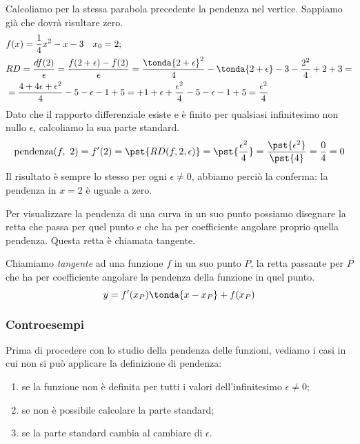 \begin{esempio}
Calcoliamo per la stessa parabola precedente la pendenza nel vertice. 
Sappiamo già che dovrà risultare zero.\\
\begin{align*}
 &f(x) = \dfrac{1}{4} x^2 -x -3 \quad x_0=2;\\
 &RD=\frac{df(2)}{\epsilon}=\frac{f(2+\epsilon) - f(2)}{\epsilon}=
  \frac{\tonda{2 +\epsilon}^2}{4}  -\tonda{2 +\epsilon} -3 - 
           \frac{2^2}{4}  +2 +3 =\\
  &= \dfrac{4 +4 \epsilon +\epsilon^2}{4} -5 -\epsilon - 1 +5 =
 +1+ \epsilon +\frac{\epsilon^2}{4} -5 -\epsilon - 1 +5 =
 \frac{\epsilon^2}{4}
  \end{align*}
Dato che il rapporto differenziale esiste e è finito per qualsiasi 
infinitesimo non nullo \(\epsilon\), calcoliamo la sua parte standard.
\[\text{pendenza}(f,~2) = f'(2) = 
  \pst{RD(f, 2, \epsilon)} = \pst{\frac{\epsilon^2}{4}} = 
  \frac{\pst{\epsilon^2}}{\pst{4}} = \frac{0}{4} = 0\]
Il risultato è sempre lo stesso per ogni \(\epsilon \ne 0\), abbiamo 
perciò la conferma: la pendenza in \(x=2\) è uguale a zero.
\end{esempio}

Per visualizzare la pendenza di una curva in un suo punto 
possiamo disegnare la retta che passa per quel punto e che ha per 
coefficiente angolare proprio quella pendenza. 
Questa retta è chiamata tangente.

\begin{definizione}
Chiamiamo \emph{tangente} ad una funzione \(f\) in un suo punto \(P\), 
la retta passante per \(P\) che ha per coefficiente angolare la 
pendenza della funzione in quel punto.
\[y = f'(x_P) \tonda{x -x_P} +f(x_P)\]
\end{definizione}

\subsubsection{Controesempi}
\label{subsubsec:controesempi}

Prima di procedere con lo studio della pendenza delle funzioni, vediamo 
i casi in cui non si può applicare la definizione di pendenza:
\begin{enumerate} [nosep]
\item se la funzione non è definita per tutti i valori dell'infinitesimo 
\(\epsilon \ne 0\);
\item se non è possibile calcolare la parte standard;
\item se la parte standard cambia al cambiare di \(\epsilon\).
\end{enumerate}

